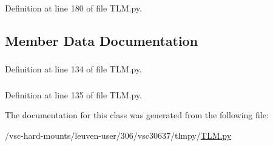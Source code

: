 Definition at line 180 of file TLM.py.

\subsection{Member Data Documentation}
\hypertarget{classtlmpy_1_1TLM_1_1Stat2Dgrid_a56f633498281a26a009a79d858562025}{
\subsubsection[{N}]{}}
\label{classtlmpy_1_1TLM_1_1Stat2Dgrid_a56f633498281a26a009a79d858562025}


Definition at line 134 of file TLM.py.\hypertarget{classtlmpy_1_1TLM_1_1Stat2Dgrid_a8d276f22a219168f7bf3b21145d693aa}{
\subsubsection[{shape}]{}}
\label{classtlmpy_1_1TLM_1_1Stat2Dgrid_a8d276f22a219168f7bf3b21145d693aa}


Definition at line 135 of file TLM.py.

The documentation for this class was generated from the following file:\begin{DoxyCompactItemize}
\item 
/vsc-\/hard-\/mounts/leuven-\/user/306/vsc30637/tlmpy/\hyperlink{TLM_8py}{TLM.py}\end{DoxyCompactItemize}
